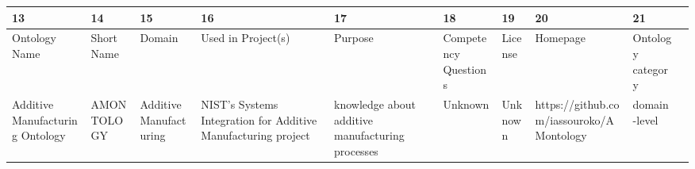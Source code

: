 \begin{tabular}{llllllllll}
  \toprule
  {}                       13 &                         14 &              15 &             16 &             17 &                18 &               19 &               20 &           21 \\
  \midrule

                                                                    Ontology Name &              Short Name &                                      Domain &                                                                                                                                                                                                                                                                                                                                                   Used in Project(s) &                                                                                                                                                                                                                                                                                                                                                                                                Purpose &                                                                                               Competency Questions &                                      License &                                                                                           Homepage & Ontology category \\
                                                  Additive Manufacturing Ontology &              AMONTOLOGY &                      Additive Manufacturing &                                                                                                                                                                                                                                                                                                       NIST's Systems Integration  for Additive Manufacturing project &                                                                                                                                                                                                                                                                                                                                                       knowledge about additive manufacturing processes &                                                                                                            Unknown &                                      Unknown &                                                           https://github.com/iassouroko/AMontology &      domain-level \\

\end{tabular}
